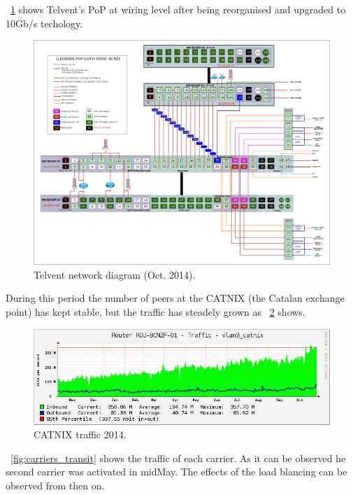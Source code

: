 \figurename~\ref{fig:telvent_diagram} shows Telvent's PoP at wiring level after being reorganised and upgraded to 10Gb/s techology.

\begin{figure}[H]
  \centering
  \includegraphics[width=0.95\linewidth]{sect3/figures/esquema_telvent_v14_3Novembre2014.png} 
  \caption[Telvent network diagram (Oct. 2014)]{Telvent network diagram (Oct. 2014).}
  \label{fig:telvent_diagram}
\end{figure}

During this period the number of peers at the CATNIX (the Catalan exchange point) has kept stable, but the traffic has steadely grown as \figurename~\ref{fig:catnix_transit} shows.

\begin{figure}[H]
  \centering
  \includegraphics[width=0.95\linewidth]{sect3/figures/catnix.png} 
  \caption[CATNIX traffic 2014]{CATNIX traffic 2014.}
  \label{fig:catnix_transit}
\end{figure}

\figurename~\ref{fig:carriers_transit} shows the traffic of each carrier. As it can be observed he second carrier was activated in midMay. The effects of the load blancing can be observed from then on.

